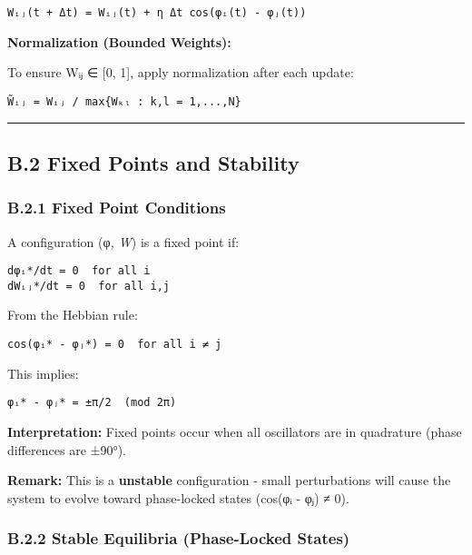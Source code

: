 \documentclass[
]{article}
\begin{document}
\begin{verbatim}
Wᵢⱼ(t + Δt) = Wᵢⱼ(t) + η Δt cos(φᵢ(t) - φⱼ(t))
\end{verbatim}

\textbf{Normalization (Bounded Weights):}

To ensure Wᵢⱼ ∈ {[}0, 1{]}, apply normalization after each update:

\begin{verbatim}
W̃ᵢⱼ = Wᵢⱼ / max{Wₖₗ : k,l = 1,...,N}
\end{verbatim}

\begin{center}\rule{0.5\linewidth}{0.5pt}\end{center}

\subsection{B.2 Fixed Points and
Stability}\label{b.2-fixed-points-and-stability}

\subsubsection{B.2.1 Fixed Point
Conditions}\label{b.2.1-fixed-point-conditions}

A configuration (φ\emph{, W}) is a fixed point if:

\begin{verbatim}
dφᵢ*/dt = 0  for all i
dWᵢⱼ*/dt = 0  for all i,j
\end{verbatim}

From the Hebbian rule:

\begin{verbatim}
cos(φᵢ* - φⱼ*) = 0  for all i ≠ j
\end{verbatim}

This implies:

\begin{verbatim}
φᵢ* - φⱼ* = ±π/2  (mod 2π)
\end{verbatim}

\textbf{Interpretation:} Fixed points occur when all oscillators are in
quadrature (phase differences are ±90°).

\textbf{Remark:} This is a \textbf{unstable} configuration - small
perturbations will cause the system to evolve toward phase-locked states
(cos(φᵢ - φⱼ) ≠ 0).

\subsubsection{B.2.2 Stable Equilibria (Phase-Locked
States)}\label{b.2.2-stable-equilibria-phase-locked-states}
\end{document}
